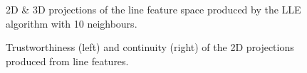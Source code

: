 \begin{figure}[H]
	\centering
	\caption{2D \& 3D projections of the line feature space produced by the LLE algorithm with 10 neighbours.}\label{fig:line_LLE_mapping}
\end{figure}
\clearpage

\clearpage
\begin{figure}[H]
	\centering
	\caption{Trustworthiness (left) and continuity (right) of the 2D projections produced from line features.}\label{fig:TC_2d_lines}
\end{figure}


